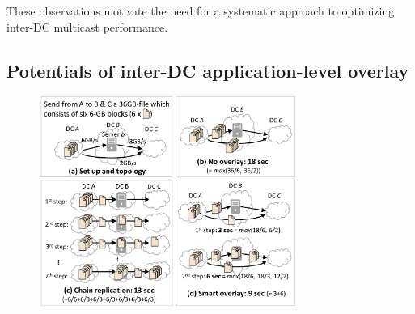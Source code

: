 \vspace{0.1cm}
These observations motivate the need for a systematic approach
to optimizing inter-DC multicast performance.


%
%
%
%

\subsection{Potentials of inter-DC application-level overlay}
\label{subsec:motivation:case-for}


\begin{figure}[t]
\centering
\includegraphics[width=84mm]{images/example-junchen.pdf}
\vspace{-0.4cm}
\label{fig:case:example}
\vspace{-0.4cm}
\end{figure}

